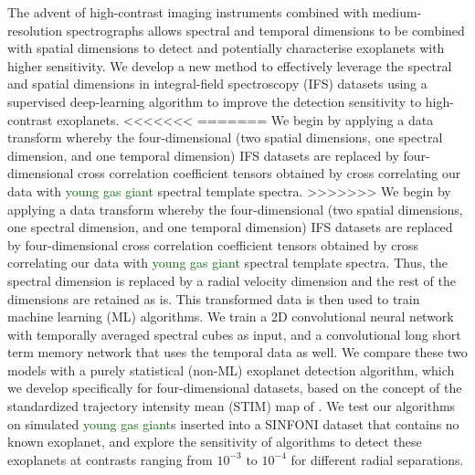 \documentclass{aa}
\newcommand{\newchange}[1]{\textcolor{darkgreen}{#1}}
\begin{document}
  \abstract
  {The advent of high-contrast imaging instruments combined with medium-resolution spectrographs allows spectral and temporal dimensions to be combined with spatial dimensions to detect and potentially characterise exoplanets with higher sensitivity.}
  {We develop a new method to effectively leverage the spectral and spatial dimensions in integral-field spectroscopy (IFS) datasets using a supervised deep-learning algorithm to improve the detection sensitivity to high-contrast exoplanets.}
  {
<<<<<<<
=======
  We begin by applying a data transform whereby the four-dimensional (two spatial dimensions, one spectral dimension, and one temporal dimension) IFS datasets are replaced by four-dimensional cross correlation coefficient tensors obtained by cross correlating our data with \newchange{young gas giant} spectral template spectra.
>>>>>>>
  We begin by applying a data transform whereby the four-dimensional (two spatial dimensions, one spectral dimension, and one temporal dimension) IFS datasets are replaced by four-dimensional cross correlation coefficient tensors obtained by cross correlating our data with \newchange{young gas giant} spectral template spectra.
  Thus, the spectral dimension is replaced by a radial velocity dimension and the rest of the dimensions are retained as is.
  This transformed data is then used to train machine learning (ML) algorithms.
  We train a 2D convolutional neural network 
  with temporally averaged spectral cubes as input, and a convolutional long short term memory network that uses the temporal data as well.
  We compare these two models with a purely statistical (non-ML) exoplanet detection algorithm, which we develop specifically for four-dimensional datasets, based on the concept of the standardized trajectory intensity mean (STIM) map of \citet{2019Pairet}.
  We test our algorithms on simulated \newchange{young gas giant}s inserted into a SINFONI dataset that contains no known exoplanet, and explore the sensitivity of algorithms to detect these exoplanets at contrasts ranging from $10^{-3}$ to $10^{-4}$ for different radial separations.
  }
\end{document}
